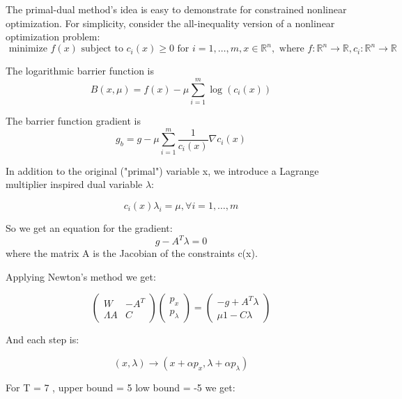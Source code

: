 \documentclass{mcmthesis}
\begin{document}
The primal-dual method's idea is easy to demonstrate for constrained nonlinear optimization. For simplicity, consider the all-inequality version of a nonlinear optimization problem:
$$\text { minimize } f(x) \text { subject to } c_{i}(x) \geq 0 \text { for } i=1, \ldots, m, x \in \mathbb{R}^{n}, \text { where } f: \mathbb{R}^{n} \rightarrow \mathbb{R}, c_{i}: \mathbb{R}^{n} \rightarrow \mathbb{R}$$

The logarithmic barrier function is
$$B(x, \mu)=f(x)-\mu \sum_{i=1}^{m} \log \left(c_{i}(x)\right)$$

The barrier function gradient is
$$g_{b}=g-\mu \sum_{i=1}^{m} \frac{1}{c_{i}(x)} \nabla c_{i}(x)$$

In addition to the original ("primal") variable x, we introduce a Lagrange multiplier inspired dual variable $\lambda$:

$$c_{i}(x) \lambda_{i}=\mu, \forall i=1, \ldots, m$$

So we get an equation for the gradient:
$$g-A^{T} \lambda=0$$
where the matrix A is the Jacobian of the constraints c(x).

Applying Newton's method we get:

$$\left(\begin{array}{cc}
W & -A^{T} \\
\Lambda A & C
\end{array}\right)\left(\begin{array}{l}
p_{x} \\
p_{\lambda}
\end{array}\right)=\left(\begin{array}{c}
-g+A^{T} \lambda \\
\mu 1-C \lambda
\end{array}\right)$$


And each step is:

$$(x, \lambda) \rightarrow\left(x+\alpha p_{x}, \lambda+\alpha p_{\lambda}\right)$$


For T = 7 , upper bound = 5  low bound = -5 we get:
\end{document}
